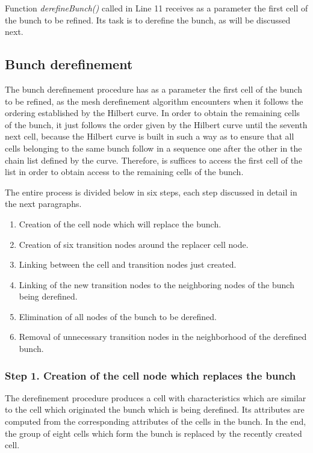 Function \textit{derefineBunch()} called in Line 11 receives as a
parameter the first cell of the bunch to be refined. Its task is to
derefine the bunch, as will be discussed next.

\subsection{Bunch derefinement} \label{SUBSEC_PROCEDURE_DEREF}
The bunch derefinement procedure has as a parameter the first cell
of the bunch to be refined, as the mesh derefinement algorithm
encounters when it follows the ordering established by the Hilbert
curve. In order to obtain the remaining cells of the bunch, it just
follows the order given by the Hilbert curve until the seventh next
cell, because the Hilbert curve is built in such a way as to ensure
that all cells belonging to the same bunch follow in a sequence one
after the other in the chain list defined by the curve. Therefore,
is suffices to access the first cell of the list in order to obtain
access to the remaining cells of the bunch.

The entire process is divided below in six steps, each step
discussed in detail in the next paragraphs.

\begin{enumerate}
\item Creation of the cell node which will replace the bunch.
\item Creation of six transition nodes around the replacer cell node.
\item Linking between the cell and transition nodes just created.
\item Linking of the new transition nodes to the neighboring nodes of the bunch being derefined.
\item Elimination of all nodes of the bunch to be derefined.
\item Removal of unnecessary transition nodes in the neighborhood of the derefined bunch.
\end{enumerate}


\subsubsection*{Step 1. Creation of the cell node which replaces the bunch}
The derefinement procedure produces a cell with characteristics
which are similar to the cell which originated the bunch which is
being derefined. Its attributes are computed from the corresponding
attributes of the cells in the bunch. In the end, the group of eight
cells which form the bunch is replaced by the recently created cell.

